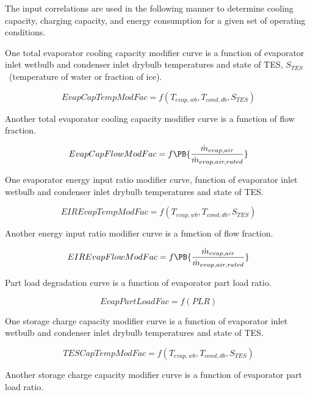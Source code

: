 The input correlations are used in the following manner to determine cooling capacity, charging capacity, and energy consumption for a given set of operating conditions.

One total evaporator cooling capacity modifier curve is a function of evaporator inlet wetbulb and condenser inlet drybulb temperatures and state of TES, \({S_{TES}}\) ~(temperature of water or fraction of ice).

\begin{equation}
EvapCapTempModFac = f\left( {{T_{evap,wb}},{T_{cond,db}},{S_{TES}}} \right)
\end{equation}

Another total evaporator cooling capacity modifier curve is a function of flow fraction.

\begin{equation}
EvapCapFlowModFac = f\PB{\frac{\dot{m}_{evap,air}}{\dot{m}_{evap,air,rated}}}
\end{equation}

One evaporator energy input ratio modifier curve, function of evaporator inlet wetbulb and condenser inlet drybulb temperatures and state of TES.

\begin{equation}
EIREvapTempModFac = f\left( {{T_{evap,wb}},{T_{cond,db}},{S_{TES}}} \right)
\end{equation}

Another energy input ratio modifier curve is a function of flow fraction.

\begin{equation}
EIREvapFlowModFac = f\PB{\frac{\dot{m}_{evap,air}}{\dot{m}_{evap,air,rated}}}
\end{equation}

Part load degradation curve is a function of evaporator part load ratio.

\begin{equation}
EvapPartLoadFac = f\left( {PLR} \right)
\end{equation}

One storage charge capacity modifier curve is a function of evaporator inlet wetbulb and condenser inlet drybulb temperatures and state of TES.

\begin{equation}
TESCapTempModFac = f\left( {{T_{evap,wb}},{T_{cond,db}},{S_{TES}}} \right)
\end{equation}

Another storage charge capacity modifier curve is a function of evaporator part load ratio.

